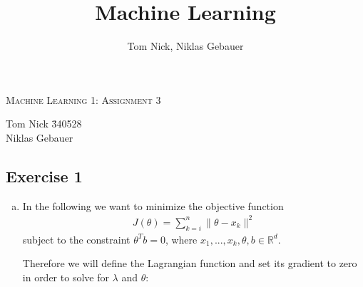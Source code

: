 \documentclass[10pt,a4paper]{article}
\author{Tom Nick, Niklas Gebauer}
\title{Machine Learning}
\begin{document}
\begin{center}
\Large{\textsc{Machine Learning 1: Assignment 3}} \\
\end{center}

\begin{tabbing}
Tom Nick \hspace{0.9cm}\= 340528\\
Niklas Gebauer 
\end{tabbing}

\subsection*{Exercise 1}
\begin{enumerate}[(a)]
\item
In the following we want to minimize the objective function
\begin{align*}
    J(\theta) = \sum_{k = i}^{n} \|\theta-x_k\|^2
\end{align*}
subject to the constraint $\theta^T b = 0$, where $x_1, ..., x_k, \theta, b \in \mathbb{R}^d$.

Therefore we will define the Lagrangian function and set its gradient to zero in order to solve for $\lambda$ and $\theta$:


\end{enumerate}
\end{document}

